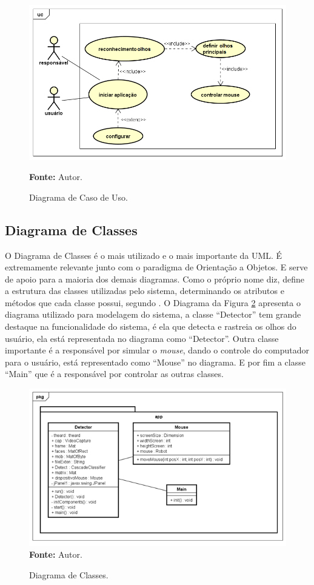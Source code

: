 \begin{figure}[htbp]
\caption{Diagrama de Caso de Uso.}
\centering \includegraphics[scale=.6]{img/UseCase_Diagram_2.png}

\textbf{Fonte:} Autor.
\label{fig:use-case-diagram}
\end{figure}

\subsection{Diagrama de Classes}
O Diagrama de Classes é o mais utilizado e o mais importante da UML. É extremamente relevante junto com o paradigma de Orientação a Objetos. E serve de apoio para a maioria dos demais diagramas. Como o próprio nome diz, define a estrutura das classes utilizadas pelo sistema, determinando os atributos e métodos que cada classe possui, segundo . O Diagrama da Figura \ref{fig:diagrama-classes} apresenta o diagrama utilizado para modelagem do sistema, a classe “Detector” tem grande destaque na funcionalidade do sistema, é ela que detecta e rastreia os olhos do usuário, ela está representada no diagrama como “Detector”. Outra classe importante é a responsável por simular o \textit{mouse}, dando o controle do computador para o usuário, está representado como “Mouse” no diagrama. E por fim a classe “Main” que é a responsável por controlar as outras classes. 

\begin{figure}[htbp]
\caption{Diagrama de Classes.} 
\centering \includegraphics[scale=1]{img/diagrama-classes.png}
\textbf{Fonte:} Autor.
\label{fig:diagrama-classes}
\end{figure}


